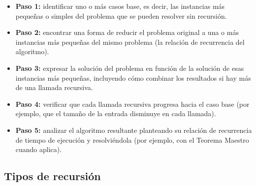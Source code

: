 \documentclass{article}
\begin{document}
\begin{itemize}
  \item \textbf{Paso 1:} identificar uno o más casos base, es decir, las
        instancias más pequeñas o simples del problema que se pueden
        resolver sin recursión.
  \item \textbf{Paso 2:} encontrar una forma de reducir el problema original
        a una o más instancias más pequeñas del mismo problema (la relación
        de recurrencia del algoritmo).
  \item \textbf{Paso 3:} expresar la solución del problema en función de la
        solución de esas instancias más pequeñas, incluyendo cómo combinar
        los resultados si hay más de una llamada recursiva.
  \item \textbf{Paso 4:} verificar que cada llamada recursiva progresa hacia
        el caso base (por ejemplo, que el tamaño de la entrada disminuye en
        cada llamada).
  \item \textbf{Paso 5:} analizar el algoritmo resultante planteando su
        relación de recurrencia de tiempo de ejecución y resolviéndola (por
        ejemplo, con el Teorema Maestro cuando aplica).
\end{itemize}
 
\subsection{Tipos de recursión}
 
\end{document}
